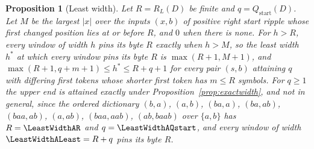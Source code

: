 \documentclass[11pt,a4paper]{article}
\theoremstyle{definition}
\theoremstyle{plain}
\newtheorem{proposition}{Proposition}
\newcommand{\ripple}{R_{L}}
\begin{document}

\begin{proposition}[Least width]\label{prop:leastwidth}
Let \(R = \ripple(D)\) be finite and \(q = Q_{\mathrm{start}}(D)\). Let \(M\) be the largest \(|x|\) over the inputs
\((x, b)\) of positive right start ripple whose first changed position lies at or before \(R\), and \(0\) when there is
none. For \(h > R\), every window of width \(h\) pins its byte \(R\) exactly when \(h > M\), so the least width \(h^*\)
at which every window pins its byte \(R\) is \(\max(R + 1, M + 1)\), and
\(\max(R + 1, q + m + 1) \le h^* \le R + q + 1\) for every pair \((s, b)\) attaining \(q\) with differing first tokens
whose shorter first token has \(m \le R\) symbols. For \(q \ge 1\) the upper end is attained exactly under
Proposition~\ref{prop:exactwidth}, and not in general, since the ordered dictionary \((b, a)\), \((a, b)\), \((ba, a)\),
\((ba, ab)\), \((baa, ab)\), \((a, ab)\), \((baa, aab)\), \((ab, baab)\) over \(\{a, b\}\) has \(R = \LeastWidthAR\) and
\(q = \LeastWidthAQstart\), and every window of width \(\LeastWidthALeast = R + q\) pins its byte \(R\).
\end{proposition}
\end{document}
